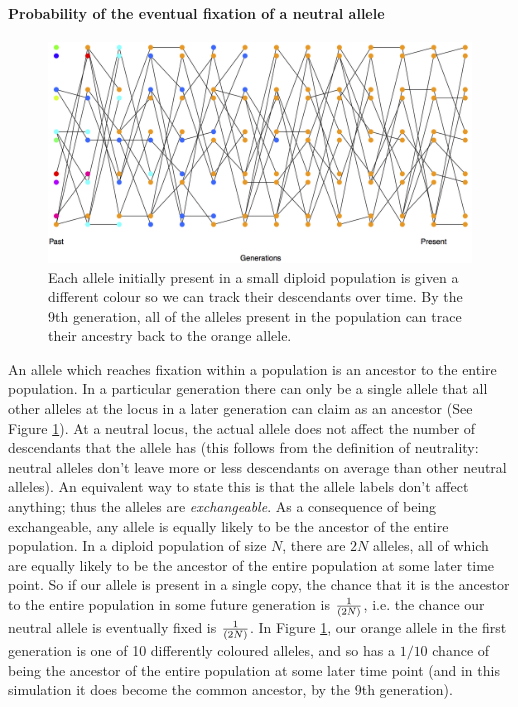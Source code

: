 \paragraph{Probability of the eventual fixation of a neutral allele}
\begin{figure}
\begin{center}
  \includegraphics[width = \textwidth]{figures/Substitution_sim.png}
\end{center}
\caption{Each allele initially present in a small diploid population is
  given a different colour so we can track their descendants over
  time. By the 9th generation, all of the alleles present in the
  population can trace their ancestry back to the orange allele.} \label{fig:subs_simulation}
\end{figure}

An allele which reaches fixation within a population is an ancestor to the
entire population. In a particular generation there can only be a single allele
that all other alleles at the locus in a later generation can claim as an
ancestor (See Figure \ref{fig:subs_simulation}). At a neutral locus, the actual allele does not affect the number of
descendants that the allele has (this follows from the definition of
neutrality: neutral alleles don't leave more or less descendants on average than other neutral alleles).
An equivalent way to state this is that the allele labels don't affect
anything; thus the alleles are \emph{exchangeable}. As a consequence of being exchangeable,
any allele is equally likely to be the ancestor of the entire population.  In a
diploid population of size $N$, there are $2N$ alleles, all of which are
equally likely to be the ancestor of the entire population at some later time
point. So if our allele is present in a single copy, the chance that it is the
ancestor to the entire population in some future generation is
$\nicefrac{1}{(2N)}$, i.e. the chance our neutral allele is eventually fixed is
$\nicefrac{1}{(2N)}$.  In Figure \ref{fig:subs_simulation}, our orange allele
in the first generation is one of 10 differently coloured alleles, and so has a
$1/10$ chance of being the ancestor of the entire population at some later time
point (and in this simulation it does become the common ancestor, by the 9th generation).\\

